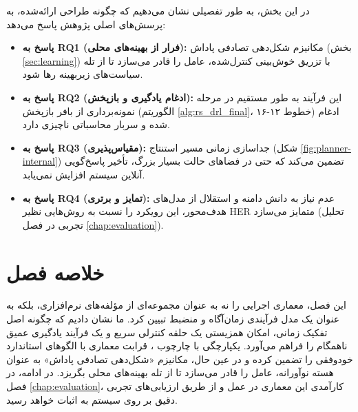 \documentclass[oneside,openany,phd]{TMU-Thesis}
\begin{document}
در این بخش، به طور تفصیلی نشان می‌دهیم که چگونه طراحی ارائه‌شده، به پرسش‌های اصلی پژوهش پاسخ می‌دهد:

\begin{itemize}
    \item \textbf{پاسخ به RQ1 (فرار از بهینه‌های محلی):} مکانیزم شکل‌دهی تصادفی پاداش (بخش \ref{sec:learning}) با تزریق خوش‌بینی کنترل‌شده، عامل را قادر می‌سازد تا از تله سیاست‌های زیربهینه رها شود.
    \item \textbf{پاسخ به RQ2 (ادغام یادگیری و بازپخش):} این فرآیند به طور مستقیم در مرحله نمونه‌برداری از بافر بازپخش (الگوریتم \ref{alg:rs_drl_final}، خطوط ۱۲-۱۶) ادغام شده و سربار محاسباتی ناچیزی دارد.
    \item \textbf{پاسخ به RQ3 (مقیاس‌پذیری):} جداسازی زمانی مسیر استنتاج (شکل \ref{fig:planner-internal}) تضمین می‌کند که حتی در فضاهای حالت بسیار بزرگ، تأخیر پاسخ‌گویی آنلاین سیستم افزایش نمی‌یابد.
    \item \textbf{پاسخ به RQ4 (تمایز و برتری):} عدم نیاز به دانش دامنه و استقلال از مدل‌های هدف‌محور، این رویکرد را نسبت به روش‌هایی نظیر HER متمایز می‌سازد (تحلیل تجربی در فصل \ref{chap:evaluation}).
\end{itemize}

\section{خلاصه فصل}
\label{sec:summary-process}

این فصل، معماری اجرایی  را نه به عنوان مجموعه‌ای از مؤلفه‌های نرم‌افزاری، بلکه به عنوان یک مدل فرآیندی زمان‌آگاه و منضبط تبیین کرد. ما نشان دادیم که چگونه اصل تفکیک زمانی، امکان همزیستی یک حلقه کنترلی سریع و یک فرآیند یادگیری عمیق ناهمگام را فراهم می‌آورد. یکپارچگی با چارچوب ، قرابت معماری با الگوهای استاندارد خودوفقی را تضمین کرده و در عین حال، مکانیزم «شکل‌دهی تصادفی پاداش» به عنوان هسته نوآورانه، عامل را قادر می‌سازد تا از تله بهینه‌های محلی بگریزد. در ادامه، در فصل \ref{chap:evaluation}، کارآمدی این معماری در عمل و از طریق ارزیابی‌های تجربی دقیق بر روی سیستم  به اثبات خواهد رسید.



\end{document}
